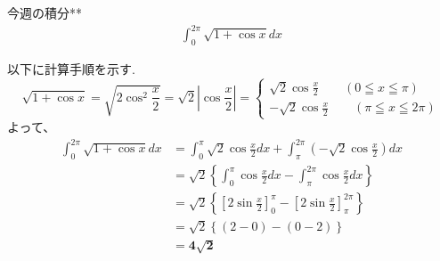 \documentclass[main]{subfiles}
\begin{document}

\begin{mondai}{2}{今週の積分}{**}
    \begin{align*}
        \int_0^{2\pi} \sqrt{1+\cos x} dx
    \end{align*}
\end{mondai}


\solutionhead
\hfill
以下に計算手順を示す.
\hfill\
\begin{equation*}
    \sqrt{1+\cos x} = \sqrt{2\cos ^2 \frac{x}{2}} = \sqrt{2}\left| \cos \frac{x}{2} \right| = 
    \begin{cases}
        \sqrt{2} \cos \frac{x}{2} \qquad (0\leqq x \leqq \pi)\\
        -\sqrt{2} \cos \frac{x}{2} \qquad (\pi\leqq x \leqq 2\pi)
    \end{cases}
\end{equation*}
よって、
\begin{align*}
    \int ^{2\pi}_0 \sqrt{1+\cos x} dx
        &= \int^\pi_0 \sqrt{2} \cos \frac{x}{2}dx + \int^{2\pi}_\pi \left(-\sqrt{2} \cos \frac{x}{2}\right)dx \\
        &= \sqrt{2} \left\{\int^\pi_0 \cos \frac{x}{2}dx - \int^{2\pi}_\pi \cos \frac{x}{2}dx \right\} \\
        &= \sqrt{2} \left\{ \left[ 2\sin \frac{x}{2} \right]^\pi_0 - \left[ 2\sin \frac{x}{2} \right]^{2\pi}_\pi \right\} \\
        &= \sqrt{2} \left\{ (2-0) - (0-2) \right\} \\
        &= \boldsymbol{4 \sqrt{2}}
\end{align*}
\end{document}
